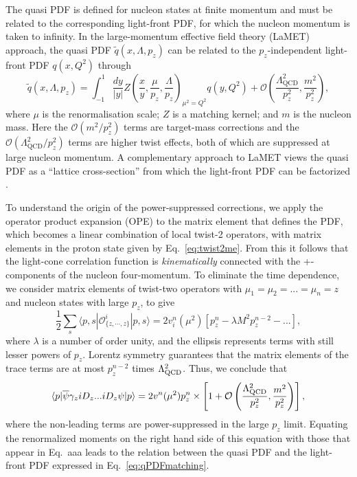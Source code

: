 The quasi PDF is defined for nucleon states at finite momentum and must be related to the corresponding light-front PDF, for which the nucleon momentum is taken to infinity.
In the  large-momentum  effective field theory (LaMET) approach, the quasi PDF $\widetilde{q}(x,\Lambda,p_z)$ can be related to the $p_z$-independent
light-front PDF $q(x,Q^2)$ through~\cite{Ji:2013dva,Ji:2014gla}
\begin{equation} \label{eq:qPDFmatching}
\widetilde{q}(x,\Lambda ,p_z) = 
  \int_{-1}^1 \frac{dy}{\left\vert y\right\vert} 
    Z\left( \frac{x}{y}, \frac{\mu}{p_z}, \frac{\Lambda}{p_z}\right)_{\mu^2 = Q^2} q(y,Q^2) +
  \mathcal{O}\left( \frac{\Lambda_\text{QCD}^2}{p_z^2},\frac{m^2}{p_z^2}\right), 
\end{equation}
where $\mu$ is the renormalisation scale;
$Z$ is a matching kernel; and $m$ is the nucleon mass.
Here the $\mathcal{O}\left(m^2/p_z^2\right)$ terms are target-mass corrections and the $ \mathcal{O}\left(\Lambda_\text{QCD}^2/p_z^2\right)$ terms are higher twist effects, both of which are suppressed at large nucleon momentum. A complementary approach to LaMET views the quasi PDF as a ``lattice cross-section'' from which the light-front PDF can be factorized \cite{Ma:2014jla, Ma:2014jga}. 

To understand the origin of the power-suppressed corrections, we apply the operator product expansion (OPE) to the matrix element that defines the PDF, which becomes a linear combination of local twist-2 operators, with matrix elements in the proton state given by Eq.~\eqref{eq:twist2me}. From this it follows that the light-cone correlation function is {\it kinematically} connected with the +-components of the nucleon four-momentum. To eliminate the time dependence, we consider matrix elements of twist-two operators with $\mu_1=\mu_2=...=\mu_n=z$ and nucleon states with large $p_z$, to give
\begin{equation}
\frac{1}{2} \sum_s \langle p,s|\mathcal{O}^i_{\{z,\cdots,z\}}|p,s\rangle = 2v_i^n(\mu^2)\left[p_z^n-\lambda M^2 p_z^{n-2}-...\right], 
\end{equation}
where $\lambda$ is a number of order unity, and the ellipsis represents terms
with still lesser powers of $p_z$. Lorentz symmetry guarantees that the matrix elements of the trace terms are at most
$p_z^{n-2}$ times $\Lambda^2_{\rm QCD}$. Thus, we conclude that
\begin{equation}
      \langle p| {\overline \psi}\gamma_ziD_z ... iD_z \psi|p\rangle
       = 2v^n(\mu^2) p_z^n\times \left[ 1 + {\cal O}\left(\frac{\Lambda^2_{\rm QCD}}{p_z^2},  \frac{m^2}{p_z^2}\right)\right],
\end{equation}
where the non-leading terms are power-suppressed in the large $p_z$ limit. Equating the renormalized moments on the right hand side of this equation with those that appear in Eq.~aaa
leads to the relation between the quasi PDF and the light-front PDF expressed in Eq.~\eqref{eq:qPDFmatching}.

